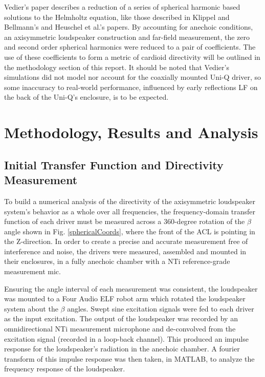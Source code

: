 \documentclass{report}
\begin{document}
        Vedier's paper describes a reduction of a series of spherical harmonic based solutions to the Helmholtz equation, like those described in Klippel and Bellmann's and Heuschel et al.'s papers.
        By accounting for anechoic conditions, an axisymmetric loudspeaker construction and far-field measurement, the zero and second order spherical harmonics were reduced to a pair of coefficients.
        The use of these coefficients to form a metric of cardioid directivity will be outlined in the methodology section of this report.
        It should be noted that Vedier's simulations did not model nor account for the coaxially mounted Uni-Q driver, so some inaccuracy to real-world performance, influenced by early reflections LF on the back of the Uni-Q's enclosure, is to be expected.

\chapter{Methodology, Results and Analysis}
    \section{Initial Transfer Function and Directivity Measurement}
        To build a numerical analysis of the directivity of the axisymmetric loudspeaker system's behavior as a whole over all frequencies, the frequency-domain transfer function of each driver must be measured across a 360-degree rotation of the $\beta$ angle shown in Fig. \ref{sphericalCoords}, where the front of the ACL is pointing in the Z-direction.
        In order to create a precise and accurate measurement free of interference and noise, the drivers were measured, assembled and mounted in their enclosures, in a fully anechoic chamber with a NTi reference-grade measurement mic.

        Ensuring the angle interval of each measurement was consistent, the loudspeaker was mounted to a Four Audio ELF robot arm which rotated the loudspeaker system about the $\beta$ angles.
        Swept sine excitation signals were fed to each driver as the input excitation.
        The output of the loudspeaker was recorded by an omnidirectional NTi measurement microphone and de-convolved from the excitation signal (recorded in a loop-back channel).
        This produced an impulse response for the loudspeaker's radiation in the anechoic chamber.
        A fourier transform of this impulse response was then taken, in MATLAB, to analyze the frequency response of the loudspeaker.
\end{document}
